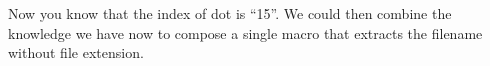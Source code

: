 Now you know that the index of dot is ``15''. We could then combine the knowledge we have now to compose a single macro that extracts the filename without file extension.